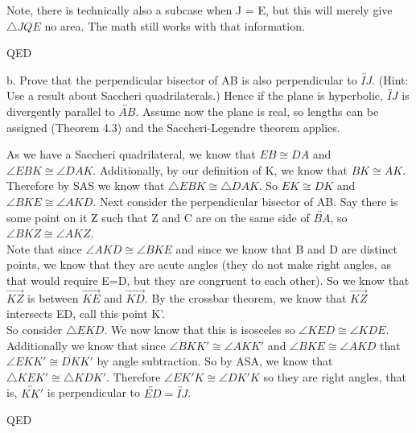 \documentclass[12pt,letterpaper]{article}
\newcommand{\Proof}{\noindent {\bf Proof: }}
\newcommand{\QED}{\begin{flushright}QED\end{flushright}}
\begin{document}
Note, there is technically also a subcase when J = E, but this will merely give $\triangle JQE$ no area.  The math still works with that information. 

\QED





\newpage 

b. Prove that the perpendicular bisector of AB is also perpendicular to $\overleftrightarrow{IJ}$. (Hint: Use a result about Saccheri quadrilaterals.)  Hence if the plane is hyperbolic, $\overleftrightarrow{IJ}$ is divergently parallel to $\overleftrightarrow{AB}$.  Assume now the plane is real, so lengths can be assigned (Theorem 4.3) and the Saccheri-Legendre theorem applies. \\

\Proof

As we have a Saccheri quadrilateral, we know that $EB \cong DA$ and $\angle EBK \cong \angle DAK$.  Additionally, by our definition of K, we know that $BK \cong AK$.  Therefore by SAS we know that $\triangle EBK \cong \triangle DAK$.  So $EK \cong DK$ and $\angle BKE \cong \angle AKD$.  Next consider the perpendicular bisector of AB.  Say there is some point on it Z such that Z and C are on the same side of $\overleftrightarrow{BA}$, so $\angle BKZ \cong \angle AKZ$. \\

Note that since $\angle AKD \cong \angle BKE$ and since we know that B and D are distinct points, we know that they are acute angles (they do not make right angles, as that would require E=D, but they are congruent to each other). So we know that $\overrightarrow{KZ}$ is between $\overrightarrow{KE}$ and $\overrightarrow{KD}$.  By the crossbar theorem, we know that $\overrightarrow{KZ}$ intersects ED, call this point K'.\\

So consider $\triangle EKD$.  We now know that this is isosceles so $\angle KED \cong \angle KDE$. Additionally we know that since $\angle BKK' \cong \angle AKK'$ and $\angle BKE \cong \angle AKD$ that $\angle EKK' \cong  DKK'$ by angle subtraction.  So by ASA, we know that $\triangle KEK' \cong\triangle KDK'$.  Therefore $\angle EK'K \cong \angle DK'K$ so they are right angles, that is, $\overleftrightarrow{KK'}$ is perpendicular to $\overleftrightarrow{ED} = \overleftrightarrow{IJ}$. 



\QED
\end{document}
